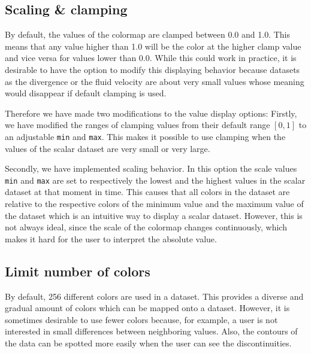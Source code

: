 	\subsection{Scaling \& clamping}
		By default, the values of the colormap are clamped between 0.0 and 1.0. 
		This means that any value higher than 1.0 will be the color at the higher clamp value and vice versa for values lower than 0.0.
		While this could work in practice, it is desirable to have the option to modify this displaying behavior because datasets as the divergence or the fluid velocity are about very small values whose meaning would disappear if default clamping is used.

		Therefore we have made two modifications to the value display options:
		Firstly, we have modified the ranges of clamping values from their default range \([0, 1]\) to an adjustable \texttt{min} and \texttt{max}. 
		This makes it possible to use clamping when the values of the scalar dataset are very small or very large.

		Secondly, we have implemented scaling behavior. 
		In this option the scale values \texttt{min} and \texttt{max} are set to respectively the lowest and the highest values in the scalar dataset at that moment in time. 
		This causes that all colors in the dataset are relative to the respective colors of the minimum value and the maximum value of the dataset which is an intuitive way to display a scalar dataset.
		However, this is not always ideal, since the scale of the colormap changes continuously, which makes it hard for the user to interpret the absolute value.

	\clearpage

	\subsection{Limit number of colors}
		By default, 256 different colors are used in a dataset. 
		This provides a diverse and gradual amount of colors which can be mapped onto a dataset.
		However, it is sometimes desirable to use fewer colors because, for example, a user is not interested in small differences between neighboring values.
		Also, the contours of the data can be spotted more easily when the user can see the discontinuities.

